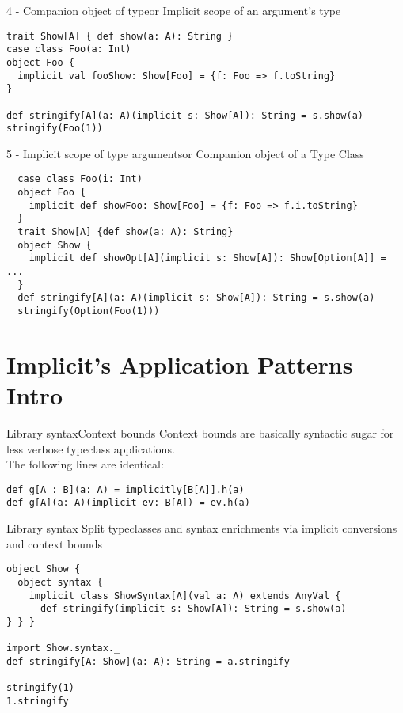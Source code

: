 \documentclass[aspectratio=169]{beamer}
\begin{document}
\begin{frame}[fragile]{4 - Companion object of type}{or Implicit scope of an argument’s type}
\bigskip
\begin{verbatim}
trait Show[A] { def show(a: A): String }
case class Foo(a: Int)
object Foo {
  implicit val fooShow: Show[Foo] = {f: Foo => f.toString}
}

def stringify[A](a: A)(implicit s: Show[A]): String = s.show(a)
stringify(Foo(1))
\end{verbatim}
\end{frame}

\begin{frame}[fragile]{5 - Implicit scope of type arguments}{or Companion object of a Type Class}
\begin{verbatim}
  case class Foo(i: Int)
  object Foo {
    implicit def showFoo: Show[Foo] = {f: Foo => f.i.toString}
  }
  trait Show[A] {def show(a: A): String}
  object Show {
    implicit def showOpt[A](implicit s: Show[A]): Show[Option[A]] = ...
  }
  def stringify[A](a: A)(implicit s: Show[A]): String = s.show(a)
  stringify(Option(Foo(1)))
\end{verbatim}
\end{frame}

\section{Implicit's Application Patterns Intro}

\begin{frame}[fragile]{Library syntax}{Context bounds}
Context bounds are basically syntactic sugar for less verbose typeclass applications.\\
The following lines are identical:
\bigskip
\begin{verbatim}
def g[A : B](a: A) = implicitly[B[A]].h(a)
def g[A](a: A)(implicit ev: B[A]) = ev.h(a)
\end{verbatim}
\end{frame}

\begin{frame}[fragile]{Library syntax}
Split typeclasses and syntax enrichments via implicit conversions and context bounds
\begin{verbatim}
object Show {
  object syntax {
    implicit class ShowSyntax[A](val a: A) extends AnyVal {
      def stringify(implicit s: Show[A]): String = s.show(a)
} } }

import Show.syntax._
def stringify[A: Show](a: A): String = a.stringify

stringify(1)
1.stringify
\end{verbatim}
\end{frame}
\end{document}
